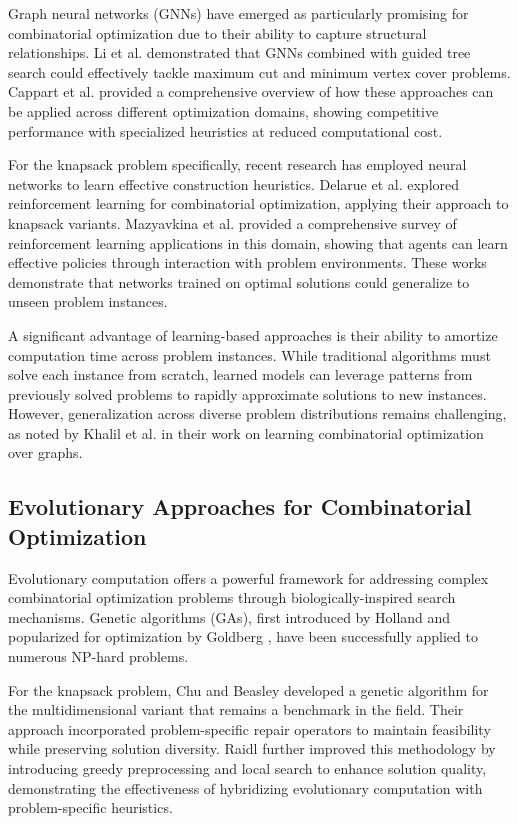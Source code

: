 \documentclass[conference, a4paper]{IEEEtran}
\begin{document}
Graph neural networks (GNNs) have emerged as particularly promising for combinatorial optimization due to their ability to capture structural relationships. Li et al. \cite{li2018combinatorial} demonstrated that GNNs combined with guided tree search could effectively tackle maximum cut and minimum vertex cover problems. Cappart et al. \cite{cappart2021combinatorial} provided a comprehensive overview of how these approaches can be applied across different optimization domains, showing competitive performance with specialized heuristics at reduced computational cost.

For the knapsack problem specifically, recent research has employed neural networks to learn effective construction heuristics. Delarue et al. \cite{delarue2020reinforcement} explored reinforcement learning for combinatorial optimization, applying their approach to knapsack variants. Mazyavkina et al. \cite{mazyavkina2021reinforcement} provided a comprehensive survey of reinforcement learning applications in this domain, showing that agents can learn effective policies through interaction with problem environments. These works demonstrate that networks trained on optimal solutions could generalize to unseen problem instances.

A significant advantage of learning-based approaches is their ability to amortize computation time across problem instances. While traditional algorithms must solve each instance from scratch, learned models can leverage patterns from previously solved problems to rapidly approximate solutions to new instances. However, generalization across diverse problem distributions remains challenging, as noted by Khalil et al. \cite{khalil2017learning} in their work on learning combinatorial optimization over graphs.

\subsection{Evolutionary Approaches for Combinatorial Optimization}
Evolutionary computation offers a powerful framework for addressing complex combinatorial optimization problems through biologically-inspired search mechanisms. Genetic algorithms (GAs), first introduced by Holland \cite{holland1992adaptation} and popularized for optimization by Goldberg \cite{goldberg1989genetic}, have been successfully applied to numerous NP-hard problems.

For the knapsack problem, Chu and Beasley \cite{chu1998genetic} developed a genetic algorithm for the multidimensional variant that remains a benchmark in the field. Their approach incorporated problem-specific repair operators to maintain feasibility while preserving solution diversity. Raidl \cite{raidl1998hybrid} further improved this methodology by introducing greedy preprocessing and local search to enhance solution quality, demonstrating the effectiveness of hybridizing evolutionary computation with problem-specific heuristics.
\end{document}
